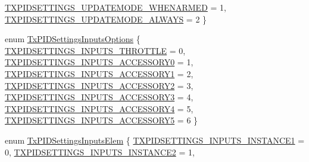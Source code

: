 \begin{DoxyCompactItemize}
\hyperlink{group___tx_p_i_d_settings_ggab1f5f1bddd5a36c4ea73b40f917d8118a60a572599c569b2d2813ff9eb454f148}{\-T\-X\-P\-I\-D\-S\-E\-T\-T\-I\-N\-G\-S\-\_\-\-U\-P\-D\-A\-T\-E\-M\-O\-D\-E\-\_\-\-W\-H\-E\-N\-A\-R\-M\-E\-D} = 1, 
\hyperlink{group___tx_p_i_d_settings_ggab1f5f1bddd5a36c4ea73b40f917d8118a522302c57362bb584762f1898799844f}{\-T\-X\-P\-I\-D\-S\-E\-T\-T\-I\-N\-G\-S\-\_\-\-U\-P\-D\-A\-T\-E\-M\-O\-D\-E\-\_\-\-A\-L\-W\-A\-Y\-S} = 2
 \}
\item 
enum \hyperlink{group___tx_p_i_d_settings_gad84be80a19753b5838b190ac0532a7dd}{\-Tx\-P\-I\-D\-Settings\-Inputs\-Options} \{ \*
\hyperlink{group___tx_p_i_d_settings_ggad84be80a19753b5838b190ac0532a7dda007a15ddb2a8ef86c7a249506f08cbad}{\-T\-X\-P\-I\-D\-S\-E\-T\-T\-I\-N\-G\-S\-\_\-\-I\-N\-P\-U\-T\-S\-\_\-\-T\-H\-R\-O\-T\-T\-L\-E} = 0, 
\hyperlink{group___tx_p_i_d_settings_ggad84be80a19753b5838b190ac0532a7dda9876d9f2c6b67d22c5e0690bfeaeb797}{\-T\-X\-P\-I\-D\-S\-E\-T\-T\-I\-N\-G\-S\-\_\-\-I\-N\-P\-U\-T\-S\-\_\-\-A\-C\-C\-E\-S\-S\-O\-R\-Y0} = 1, 
\hyperlink{group___tx_p_i_d_settings_ggad84be80a19753b5838b190ac0532a7dda2df4f0a199cdc39e832c434c910842f6}{\-T\-X\-P\-I\-D\-S\-E\-T\-T\-I\-N\-G\-S\-\_\-\-I\-N\-P\-U\-T\-S\-\_\-\-A\-C\-C\-E\-S\-S\-O\-R\-Y1} = 2, 
\hyperlink{group___tx_p_i_d_settings_ggad84be80a19753b5838b190ac0532a7ddadb465b9bbd8e0a7cae7bba68da74ea5e}{\-T\-X\-P\-I\-D\-S\-E\-T\-T\-I\-N\-G\-S\-\_\-\-I\-N\-P\-U\-T\-S\-\_\-\-A\-C\-C\-E\-S\-S\-O\-R\-Y2} = 3, 
\*
\hyperlink{group___tx_p_i_d_settings_ggad84be80a19753b5838b190ac0532a7dda176c4a1eb7c0b4401eb1b0a8549ef91b}{\-T\-X\-P\-I\-D\-S\-E\-T\-T\-I\-N\-G\-S\-\_\-\-I\-N\-P\-U\-T\-S\-\_\-\-A\-C\-C\-E\-S\-S\-O\-R\-Y3} = 4, 
\hyperlink{group___tx_p_i_d_settings_ggad84be80a19753b5838b190ac0532a7ddad4abfa7bc76b1c6d9236ed8625081990}{\-T\-X\-P\-I\-D\-S\-E\-T\-T\-I\-N\-G\-S\-\_\-\-I\-N\-P\-U\-T\-S\-\_\-\-A\-C\-C\-E\-S\-S\-O\-R\-Y4} = 5, 
\hyperlink{group___tx_p_i_d_settings_ggad84be80a19753b5838b190ac0532a7dda168a77e347abb1e476773c07336729ad}{\-T\-X\-P\-I\-D\-S\-E\-T\-T\-I\-N\-G\-S\-\_\-\-I\-N\-P\-U\-T\-S\-\_\-\-A\-C\-C\-E\-S\-S\-O\-R\-Y5} = 6
 \}
\item 
enum \hyperlink{group___tx_p_i_d_settings_gaa5c76c49515d86d364d1135d1ce41eef}{\-Tx\-P\-I\-D\-Settings\-Inputs\-Elem} \{ \hyperlink{group___tx_p_i_d_settings_ggaa5c76c49515d86d364d1135d1ce41eefab5d7093288565a5f95c10a8c48ef4492}{\-T\-X\-P\-I\-D\-S\-E\-T\-T\-I\-N\-G\-S\-\_\-\-I\-N\-P\-U\-T\-S\-\_\-\-I\-N\-S\-T\-A\-N\-C\-E1} = 0, 
\hyperlink{group___tx_p_i_d_settings_ggaa5c76c49515d86d364d1135d1ce41eefa9f3ae247f7c24d25f1455040713d11c4}{\-T\-X\-P\-I\-D\-S\-E\-T\-T\-I\-N\-G\-S\-\_\-\-I\-N\-P\-U\-T\-S\-\_\-\-I\-N\-S\-T\-A\-N\-C\-E2} = 1, 

\end{DoxyCompactItemize}

